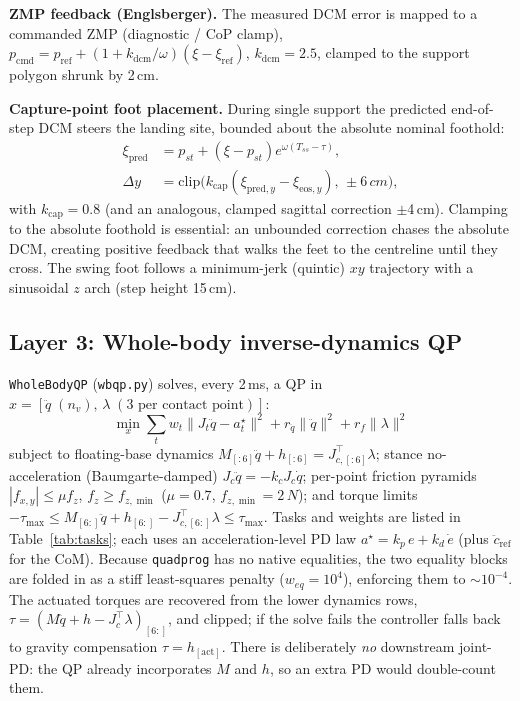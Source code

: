 \documentclass[10pt,a4paper]{article}
\newcommand{\SI}[2]{#1\,#2}          %
\newcommand{\code}[1]{\texttt{\small #1}}
\begin{document}
\textbf{ZMP feedback (Englsberger).} The measured DCM error is mapped to a
commanded ZMP (diagnostic / CoP clamp),
$p_{\text{cmd}}=p_{\text{ref}}+(1+k_{\text{dcm}}/\omega)(\xi-\xi_{\text{ref}})$,
$k_{\text{dcm}}=2.5$, clamped to the support polygon shrunk by \SI{2}{cm}.

\textbf{Capture-point foot placement.} During single support the predicted
end-of-step DCM steers the landing site, bounded about the absolute nominal
foothold:
\begin{align}
\xi_{\text{pred}} &= p_{st}+(\xi-p_{st})e^{\omega(T_{ss}-\tau)},\\
\Delta y &= \mathrm{clip}\!\big(k_{\text{cap}}(\xi_{\text{pred},y}-\xi_{\text{eos},y}),\,\pm\SI{6}{cm}\big),
\end{align}
with $k_{\text{cap}}=0.8$ (and an analogous, clamped sagittal correction
$\pm$\SI{4}{cm}). Clamping to the absolute foothold is essential: an unbounded
correction chases the absolute DCM, creating positive feedback that walks the
feet to the centreline until they cross. The swing foot follows a minimum-jerk
(quintic) $xy$ trajectory with a sinusoidal $z$ arch (step height \SI{15}{cm}).

\subsection{Layer 3: Whole-body inverse-dynamics QP}
\code{WholeBodyQP} (\code{wbqp.py}) solves, every \SI{2}{ms}, a QP in
$x=[\ddot q\;(n_v),\,\lambda\;(3\text{ per contact point})]$:
\begin{equation}
\min_x \sum_t w_t\lVert J_t\ddot q-a_t^\star\rVert^2 + r_{\ddot q}\lVert\ddot q\rVert^2 + r_f\lVert\lambda\rVert^2
\end{equation}
subject to floating-base dynamics $M_{[:6]}\ddot q+h_{[:6]}=J_{c,[:6]}^\top\lambda$;
stance no-acceleration (Baumgarte-damped) $J_c\ddot q=-k_c J_c\dot q$; per-point
friction pyramids $|f_{x,y}|\le\mu f_z$, $f_z\ge f_{z,\min}$ ($\mu=0.7$,
$f_{z,\min}=\SI{2}{N}$); and torque limits
$-\tau_{\max}\le M_{[6:]}\ddot q+h_{[6:]}-J_{c,[6:]}^\top\lambda\le\tau_{\max}$.
Tasks and weights are listed in Table~\ref{tab:tasks}; each uses an
acceleration-level PD law $a^\star=k_p\,e+k_d\,\dot e$ (plus $\ddot c_{\text{ref}}$
for the CoM). Because \code{quadprog} has no native equalities, the two equality
blocks are folded in as a stiff least-squares penalty ($w_{eq}=10^4$), enforcing
them to $\sim$$10^{-4}$. The actuated torques are recovered from the lower
dynamics rows, $\tau=(M\ddot q+h-J_c^\top\lambda)_{[6:]}$, and clipped; if the
solve fails the controller falls back to gravity compensation
$\tau=h_{[\text{act}]}$. There is deliberately \emph{no} downstream joint-PD: the
QP already incorporates $M$ and $h$, so an extra PD would double-count them.
\end{document}
